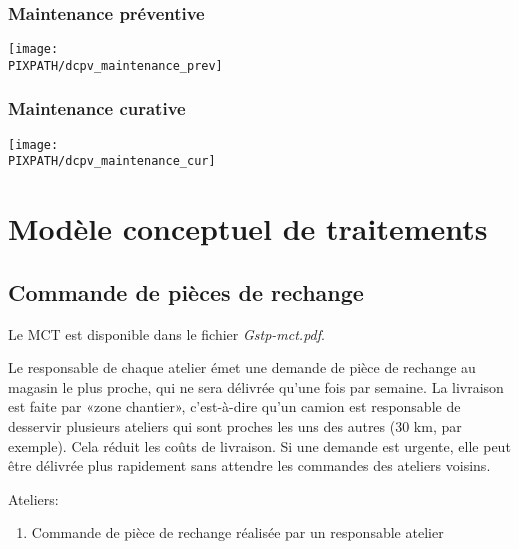 \documentclass[twoside]{article}
\newcommand\PIXPATH{./docs/pics}
\begin{document}
\subsubsection{Maintenance préventive}
\begin{center}
    \texttt{[image: \\PIXPATH/dcpv\_maintenance\_prev]}
\end{center}
\subsubsection{Maintenance curative}
\begin{center}
    \texttt{[image: \\PIXPATH/dcpv\_maintenance\_cur]}
\end{center}


\section{Modèle conceptuel de traitements}

\subsection{Commande de pièces de rechange}

Le MCT est disponible dans le fichier {\sl Gstp-mct.pdf}.

Le responsable de chaque atelier émet une demande de pièce de rechange au
magasin le plus proche, qui ne sera délivrée qu'une fois par semaine.  La
livraison est faite par «zone chantier», c'est-à-dire qu'un camion est
responsable de desservir plusieurs ateliers qui sont proches les uns des autres
(30 km, par exemple). Cela réduit les coûts de livraison.
Si une demande est urgente, elle peut être délivrée plus rapidement
sans attendre les commandes des ateliers voisins.

Ateliers:
\begin{enumerate}
    \item Commande de pièce de rechange réalisée par un responsable atelier
\end{enumerate}
\end{document}
